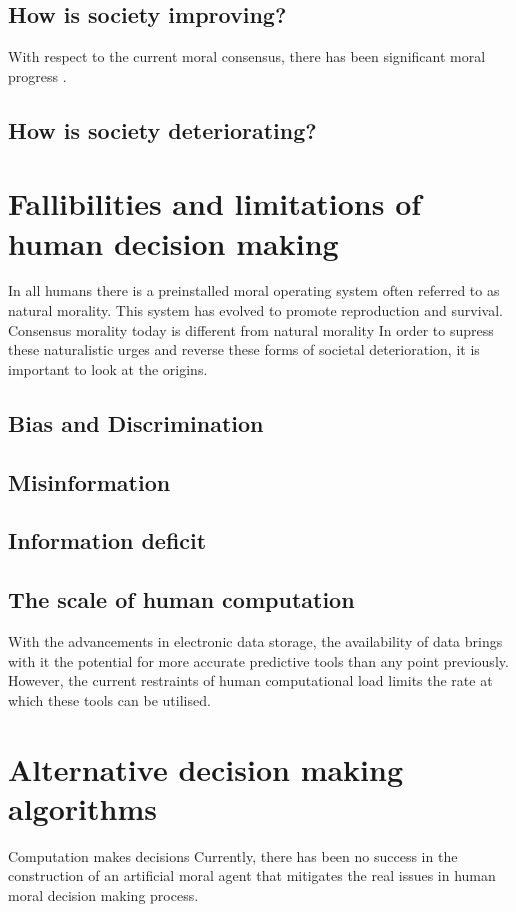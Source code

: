 \subsection{How is society improving?}
With respect to the current moral consensus, there has been significant moral progress \cite{pinker2011better}.

\subsection{How is society deteriorating?}

\section{Fallibilities and limitations of human decision making}
In all humans there is a preinstalled moral operating system often referred to as natural morality.
This system has evolved to promote reproduction and survival.
Consensus morality today is different from natural morality
In order to supress these naturalistic urges and reverse these forms of societal deterioration, it is important to look at the origins.
\subsection{Bias and Discrimination}
\subsection{Misinformation}
\subsection{Information  deficit}
\subsection{The scale of human computation}
With the advancements in electronic data storage, the availability of data brings with it the potential for more accurate predictive tools than any point previously.
However, the current restraints of human computational load limits the rate at which these tools can be utilised.

\section{Alternative decision making algorithms}
Computation makes decisions
Currently, there has been no success in the construction of an artificial moral agent that mitigates the real issues in human moral decision making process.
